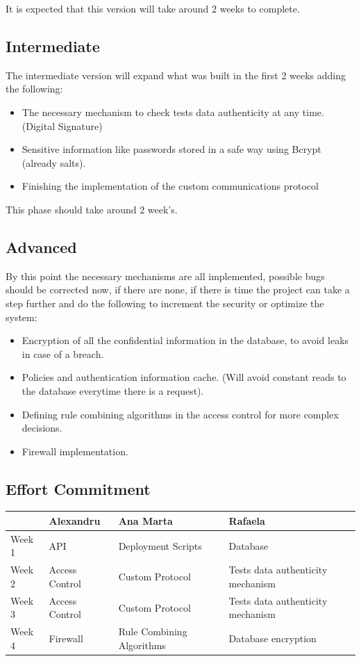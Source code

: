 It is expected that this version will take around 2 weeks to complete. 


\subsection{Intermediate}
The intermediate version will expand what was built in the first 2 weeks adding the following:
\begin{itemize}
	\item The necessary mechanism to check tests data authenticity at any time. (Digital Signature)
	\item Sensitive information like passwords stored in a safe way using Bcrypt (already salts).
	\item Finishing the implementation of the custom communications protocol
\end{itemize}

This phase should take around 2 week's.


\subsection{Advanced}

By this point the necessary mechanisms are all implemented, possible bugs should be corrected now, if there are none, if there is time the project can take a step further and do the following to increment the security or optimize the system:

\begin{itemize}
	\item Encryption of all the confidential information in the database, to avoid leaks in case of a breach.
	\item Policies and authentication information cache. (Will avoid constant reads to the database everytime there is a request).
	\item Defining rule combining algorithms in the access control for  more complex decisions.
	\item Firewall implementation.
\end{itemize}


\subsection{Effort Commitment}

\begin{tabularx}{0.8\textwidth} { 
  | >{\centering\arraybackslash}X 
  | >{\centering\arraybackslash}X 
  | >{\centering\arraybackslash}X 
  | >{\centering\arraybackslash}X | }
 \hline
  & Alexandru & Ana Marta & Rafaela \\
 \hline
 Week 1  & API & Deployment Scripts & Database \\
  \hline
  Week 2  & Access Control  & Custom Protocol & Tests data authenticity mechanism \\
   \hline
   Week 3  & Access Control  & Custom Protocol  & Tests data authenticity mechanism \\
    \hline
    Week 4  & Firewall  & Rule Combining Algorithms  & Database encryption \\
\hline
\end{tabularx}


